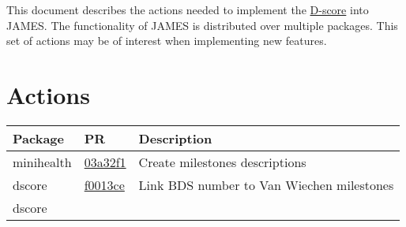 \documentclass[]{book}
\begin{document}
This document describes the actions needed to implement the
\href{https://stefvanbuuren.name/dbook1/}{D-score} into JAMES. The functionality of JAMES is distributed over multiple packages. This set of actions may be of interest when implementing new features.

\hypertarget{actions}{%
\section{Actions}\label{actions}}

\begin{longtable}[]{@{}lll@{}}
\toprule
\begin{minipage}[b]{0.26\columnwidth}\raggedright
Package\strut
\end{minipage} & \begin{minipage}[b]{0.29\columnwidth}\raggedright
PR\strut
\end{minipage} & \begin{minipage}[b]{0.36\columnwidth}\raggedright
Description\strut
\end{minipage}\tabularnewline
\midrule
\endhead
\begin{minipage}[t]{0.26\columnwidth}\raggedright
minihealth\strut
\end{minipage} & \begin{minipage}[t]{0.29\columnwidth}\raggedright
\href{https://github.com/stefvanbuuren/minihealth/commit/03a32f1960e81a685bb749911e6ea297684ab4dc}{03a32f1}\strut
\end{minipage} & \begin{minipage}[t]{0.36\columnwidth}\raggedright
Create milestones descriptions\strut
\end{minipage}\tabularnewline
\begin{minipage}[t]{0.26\columnwidth}\raggedright
dscore\strut
\end{minipage} & \begin{minipage}[t]{0.29\columnwidth}\raggedright
\href{https://github.com/stefvanbuuren/dscore/commit/f0013ce9a02d34ad25dd5c101c6a7c5b1444b53b}{f0013ce}\strut
\end{minipage} & \begin{minipage}[t]{0.36\columnwidth}\raggedright
Link BDS number to Van Wiechen milestones\strut
\end{minipage}\tabularnewline
\begin{minipage}[t]{0.26\columnwidth}\raggedright
dscore\strut
\end{minipage} & \begin{minipage}[t]{0.29\columnwidth}\raggedright

\end{minipage}
\end{longtable}
\end{document}
